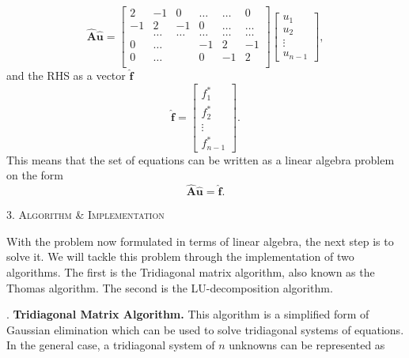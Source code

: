 \documentclass[a4paper,10pt]{article}
\begin{document}
$$
\mathbf{\hat{A}} \mathbf{\hat{u}} = 
\begin{bmatrix}
                           2& -1& 0 &\dots   & \dots &0 \\
                           -1 & 2 & -1 &0 &\dots &\dots \\
                           & \dots   & \dots &\dots   &\dots & \dots \\
                           0&\dots   &  &-1 &2& -1 \\
                           0&\dots    &  & 0  &-1 & 2 \\
\end{bmatrix}
\begin{bmatrix}
	 u_1\\
          u_2 \\
   	\vdots \\
 	u_{n-1}
\end{bmatrix},
$$
and the RHS as a vector $\mathbf{\hat{f}}$
$$ \mathbf{\hat{f}} =  
\begin{bmatrix}
	 f_1^*\\
          f_2^* \\
   	\vdots \\
 	f_{n-1}^* 
\end{bmatrix}. $$
This means that the set of equations can be written as a linear algebra problem on the form
$$ \mathbf{\hat{A}} \mathbf{\hat{u}} = \mathbf{\hat{f}}.$$

\bigskip

\begin{center}
\textsc{3. Algorithm \& Implementation }
\end{center}
With the problem now formulated in terms of linear algebra, the next step is to solve it. We will tackle this problem through the implementation of two algorithms. The first is the Tridiagonal matrix algorithm, also known as the Thomas algorithm. The second is the LU-decomposition algorithm. 
\bigskip

. \textbf{Tridiagonal Matrix Algorithm.} This algorithm is a simplified form of Gaussian elimination which can be used to solve tridiagonal systems of equations. In the general case, a tridiagonal system of $n$ unknowns can be represented as 
\end{document}
